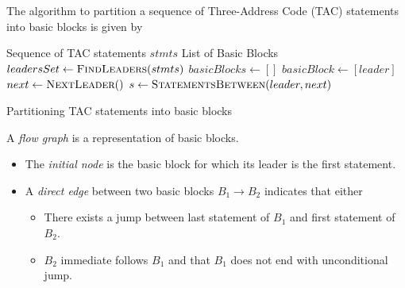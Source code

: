 \begin{definition}
    The algorithm to partition a sequence of Three-Address Code (TAC) statements into basic blocks is given by
    \begin{algorithm}[H]
        \begin{algorithmic}[1]
            \Input
                \State Sequence of TAC statements $stmts$
            \EndInput
            \Output
                \State List of Basic Blocks
            \EndOutput
                \State $leadersSet \gets \Call{FindLeaders}{stmts}$
                \State $basicBlocks \gets []$
                    \State $basicBlock \gets [leader]$
                    \State $next \gets \Call{NextLeader}{\null}$
                    \State $s \gets \Call{StatementsBetween}{leader, next}$
                    \State {}
                    \State {}
                \EndFor
                \State {}
            \EndProcedure
        \end{algorithmic}
        \caption{Partitioning TAC statements into basic blocks}
        \label{prog:tac-to-basic-blocks}
    \end{algorithm}
\end{definition}

\begin{definition}
    A \textit{flow graph} is a representation of basic blocks.
    \begin{itemize}
        \item The \textit{initial node} is the basic block for which its leader is the first statement.
        \item A \textit{direct edge} between two basic blocks $B_1 \to B_2$ indicates that either
        \begin{itemize}
            \item There exists a jump between last statement of $B_1$ and first statement of $B_2$.
            \item $B_2$ immediate follows $B_1$ and that $B_1$ does not end with unconditional jump.
        \end{itemize}
    \end{itemize}
\end{definition}

